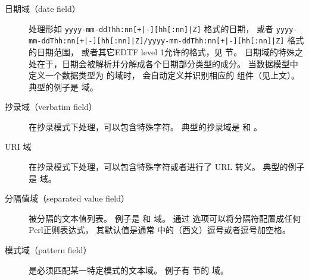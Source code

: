 \begin{description}
\begin{description}
\item[日期域（date field）] 处理形如 \texttt{yyyy-mm-ddThh:nn[+|-][hh[:nn]|Z]} 格式的日期，
或者 \texttt{yyyy-mm-ddThh:nn[+|-][hh[:nn]|Z]/yyyy-mm-ddThh:nn[+|-][hh[:nn]|Z]} 格式的日期范围，
或者其它EDTF level 1允许的格式，见  节。
日期域的特殊之处在于，日期会被解析并分解成各个日期部分类型的成分。
当数据模型中定义一个数据类型为  的域时，
会自动定义并识别相应的  组件（见上文）。
典型的例子是  域。


\item[抄录域（verbatim field）] 在抄录模式下处理，可以包含特殊字符。
典型的抄录域是  和 。

\item[URI 域] 在抄录模式下处理，可以包含特殊字符或者进行了 URL 转义。
典型的例子是  域。


\item[分隔值域（separated value field）]
被分隔的文本值列表。
例子是  和  域。
通过  选项可以将分隔符配置成任何Perl正则表达式，
其默认值是通常 \BibTeX 中的（西文）逗号或者逗号加空格。


\item[模式域（pattern field）] 是必须匹配某一特定模式的文本域。
例子有  节的  域。



\end{description}
\end{description}
